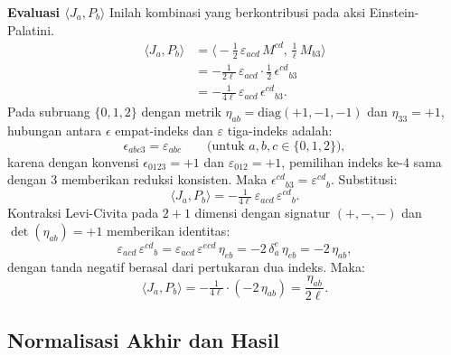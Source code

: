 \vspace{0.5em}
\noindent \textbf{Evaluasi $\langle J_a, P_b\rangle$}
Inilah kombinasi yang berkontribusi pada aksi Einstein-Palatini.
\begin{align}
    \langle J_a, P_b\rangle
    &= \big\langle -\tfrac{1}{2}\,\varepsilon_{acd}\,M^{cd},\, \tfrac{1}{\ell}\,M_{b3}\big\rangle \nonumber\\[4pt]
    &= -\tfrac{1}{2\ell}\,\varepsilon_{acd}\cdot \tfrac{1}{2}\,\epsilon^{cd}{}_{b3} \nonumber\\[4pt]
    &= -\tfrac{1}{4\ell}\,\varepsilon_{acd}\,\epsilon^{cd}{}_{b3}.
\end{align}
Pada subruang $\{0,1,2\}$ dengan metrik $\eta_{ab} = \mathrm{diag}(+1, -1, -1)$ dan $\eta_{33} = +1$, hubungan antara $\epsilon$ empat-indeks dan $\varepsilon$ tiga-indeks adalah:
\begin{equation}\label{abf-eq:eps-reduction}
    \epsilon_{abc3} = \varepsilon_{abc} \qquad\text{(untuk } a, b, c \in \{0, 1, 2\}\text{)},
\end{equation}
karena dengan konvensi $\epsilon_{0123} = +1$ dan $\varepsilon_{012} = +1$, pemilihan indeks ke-4 sama dengan $3$ memberikan reduksi konsisten. Maka $\epsilon^{cd}{}_{b3} = \varepsilon^{cd}{}_b$. Substitusi:
\begin{equation}
    \langle J_a, P_b\rangle = -\tfrac{1}{4\ell}\,\varepsilon_{acd}\,\varepsilon^{cd}{}_b.
\end{equation}
Kontraksi Levi-Civita pada $2+1$ dimensi dengan signatur $(+,-,-)$ dan $\det(\eta_{ab}) = +1$ memberikan identitas:
\begin{equation}\label{abf-eq:eps-contract}
    \varepsilon_{acd}\,\varepsilon^{cd}{}_b = \varepsilon_{acd}\,\varepsilon^{ecd}\,\eta_{eb} = -2\,\delta^e_a\,\eta_{eb} = -2\,\eta_{ab},
\end{equation}
dengan tanda negatif berasal dari pertukaran dua indeks. Maka:
\begin{equation}\label{abf-eq:JP-result-raw}
    \langle J_a, P_b\rangle = -\tfrac{1}{4\ell}\cdot(-2\,\eta_{ab}) = \frac{\eta_{ab}}{2\ell}.
\end{equation}

\subsection{Normalisasi Akhir dan Hasil}
\label{app:bilinear-norm}

